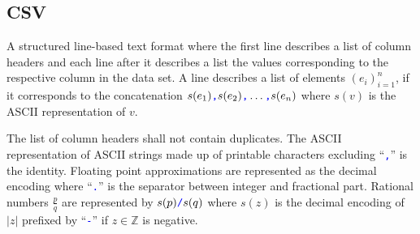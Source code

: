 \documentclass[a4paper,parskip=half]{article} %
\newcommand*\cmdstyle\texttt
\newcommand*\literalColor{blue}
\newcommand*\literal[1]{\textcolor{\literalColor}{\cmdstyle{#1}}}
\begin{document}
\subsection{CSV}\label{sec:csv}
A structured line-based text format where the first line describes a
list of column headers and each line after it describes a list the
values corresponding to the respective column in the data set.
A line describes a list of elements $(e_i)_{i=1}^n$, if it corresponds
to the concatenation
$s(e_1)\literal,s(e_2)\literal,\ldots\literal,s(e_n)$
where $s(v)$ is the ASCII representation of $v$.

The list of column headers shall not contain duplicates.
The ASCII representation of ASCII strings made up of printable
characters excluding ``\literal,'' is the identity.
Floating point approximations are represented as the decimal encoding
where ``\literal.'' is the separator between integer and fractional
part. Rational numbers $\frac pq$ are represented by $s(p)\literal/s(q)$
where $s(z)$ is the decimal encoding of $|z|$ prefixed by ``\literal-''
if $z\in\mathbb Z$ is negative.
\end{document}
